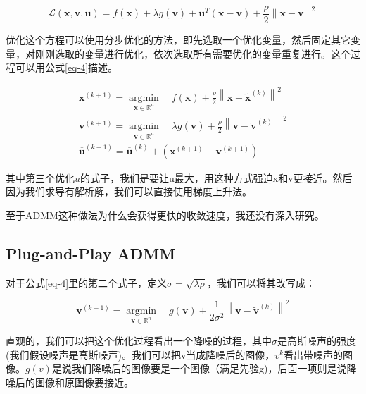 \documentclass[10pt]{article}
\begin{document}
\begin{equation}
\mathcal{L}(\boldsymbol{x}, \boldsymbol{v}, \boldsymbol{u})=f(\boldsymbol{x})+\lambda g(\boldsymbol{v})+\boldsymbol{u}^{T}(\boldsymbol{x}-\boldsymbol{v})+\frac{\rho}{2}\|\boldsymbol{x}-\boldsymbol{v}\|^{2}
\label{eq-3}	
\end{equation}

优化这个方程可以使用分步优化的方法，即先选取一个优化变量，然后固定其它变量，对刚刚选取的变量进行优化，依次选取所有需要优化的变量重复进行。这个过程可以用公式\ref{eq-4}描述。

\begin{equation}
\begin{array}{l}
\boldsymbol{x}^{(k+1)}=\underset{\boldsymbol{x} \in \mathbb{R}^{n}}{\operatorname{argmin}} \quad f(\boldsymbol{x})+\frac{\rho}{2}\left\|\boldsymbol{x}-\tilde{\boldsymbol{x}}^{(k)}\right\|^{2} \\
\boldsymbol{v}^{(k+1)}=\underset{\boldsymbol{v} \in \mathbb{R}^{n}}{\operatorname{argmin}} \quad \lambda g(\boldsymbol{v})+\frac{\rho}{2}\left\|\boldsymbol{v}-\widetilde{\boldsymbol{v}}^{(k)}\right\|^{2} \\
\overline{\boldsymbol{u}}^{(k+1)}=\overline{\boldsymbol{u}}^{(k)}+\left(\boldsymbol{x}^{(k+1)}-\boldsymbol{v}^{(k+1)}\right)
\end{array}
\label{eq-4}
\end{equation}

其中第三个优化$u$的式子，我们是要让u最大，用这种方式强迫x和v更接近。然后因为我们求导有解析解，我们可以直接使用梯度上升法。

至于ADMM这种做法为什么会获得更快的收敛速度，我还没有深入研究。

\subsection{Plug-and-Play ADMM}

对于公式\ref{eq-4}里的第二个式子，定义$\sigma = \sqrt{\lambda \rho}$，我们可以将其改写成：

\begin{equation}
\boldsymbol{v}^{(k+1)}=\underset{\boldsymbol{v} \in \mathbb{R}^{n}}{\operatorname{argmin}} \quad g(\boldsymbol{v})+\frac{1}{2 \sigma^{2}}\left\|\boldsymbol{v}-\tilde{\boldsymbol{v}}^{(k)}\right\|^{2}
\label{admm-v}
\end{equation}

直观的，我们可以把这个优化过程看出一个降噪的过程，其中$\sigma$是高斯噪声的强度(我们假设噪声是高斯噪声)。我们可以把v当成降噪后的图像，$v^{k}$看出带噪声的图像。$g(v)$是说我们降噪后的图像要是一个图像（满足先验g)，后面一项则是说降噪后的图像和原图像要接近。
\end{document}
